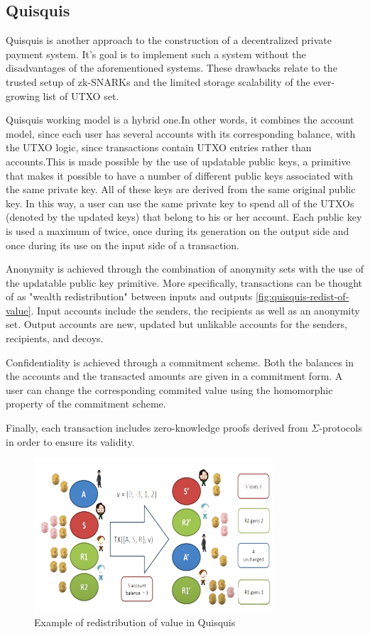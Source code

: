 \subsection{Quisquis}

Quisquis \cite{fauzi2019quisquis} is another approach to the construction of a decentralized private payment system. It's goal is to implement such a system without the disadvantages of the aforementioned systems. These drawbacks relate to the trusted setup of zk-SNARKs and the limited storage scalability of the ever-growing list of UTXO set. 

Quisquis working model is a hybrid one.In other words, it combines the account model, since each user has several accounts with its corresponding balance, with the UTXO logic, since transactions contain UTXO entries rather than accounts.This is made possible by the use of updatable public keys, a primitive that makes it possible to have a number of different public keys associated with the same private key. All of these keys are derived from the same original public key. In this way, a user can use the same private key to spend all of the UTXOs (denoted by the updated keys) that belong to his or her account. Each public key is used a maximum of twice, once during its generation on the output side and once during its use on the input side of a transaction.

Anonymity is achieved through the combination of anonymity sets with the use of the updatable public key primitive. More specifically, transactions can be thought of as "wealth redistribution" between inputs and outputs \autoref{fig:quisquis-redist-of-value}. Input accounts include the senders, the recipients as well as an anonymity set. Output accounts are new, updated but unlikable accounts for the senders, recipients, and decoys.

Confidentiality is achieved through a commitment scheme. Both the balances in the accounts and the transacted amounts are given in a commitment form. A user can change the corresponding commited value using the homomorphic property of the commitment scheme.

Finally, each transaction includes zero-knowledge proofs derived from $\Sigma$-protocols in order to ensure its validity.

\begin{figure}
    \centering
    \includegraphics[width=0.8\textwidth]{images/quisquis/redist-of-value.png}
    \caption{Example of redistribution of value in Quisquis}
    \label{fig:quisquis-redist-of-value}
\end{figure}

